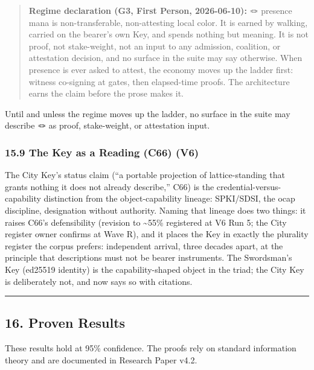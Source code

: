 \documentclass[
  11pt,
]{article}
\begin{document}
\begin{quote}
\textbf{Regime declaration (G3, First Person, 2026-06-10):} 🪢 presence
mana is non-transferable, non-attesting local color. It is earned by
walking, carried on the bearer's own Key, and spends nothing but
meaning. It is not proof, not stake-weight, not an input to any
admission, coalition, or attestation decision, and no surface in the
suite may say otherwise. When presence is ever asked to attest, the
economy moves up the ladder first: witness co-signing at gates, then
elapsed-time proofs. The architecture earns the claim before the prose
makes it.
\end{quote}

Until and unless the regime moves up the ladder, no surface in the suite
may describe 🪢 as proof, stake-weight, or attestation input.

\subsubsection{15.9 The Key as a Reading (C66)
(V6)}\label{the-key-as-a-reading-c66-v6}

The City Key's status claim (``a portable projection of lattice-standing
that grants nothing it does not already describe,'' C66) is the
credential-versus-capability distinction from the object-capability
lineage: SPKI/SDSI, the ocap discipline, designation without authority.
Naming that lineage does two things: it raises C66's defensibility
(revision to \textasciitilde55\% registered at V6 Run 5; the City
register owner confirms at Wave R), and it places the Key in exactly the
plurality register the corpus prefers: independent arrival, three
decades apart, at the principle that descriptions must not be bearer
instruments. The Swordsman's Key (ed25519 identity) is the
capability-shaped object in the triad; the City Key is deliberately not,
and now says so with citations.

\begin{center}\rule{0.5\linewidth}{0.5pt}\end{center}

\subsection{16. Proven Results}\label{proven-results}

These results hold at 95\% confidence. The proofs rely on standard
information theory and are documented in Research Paper v4.2.
\end{document}
